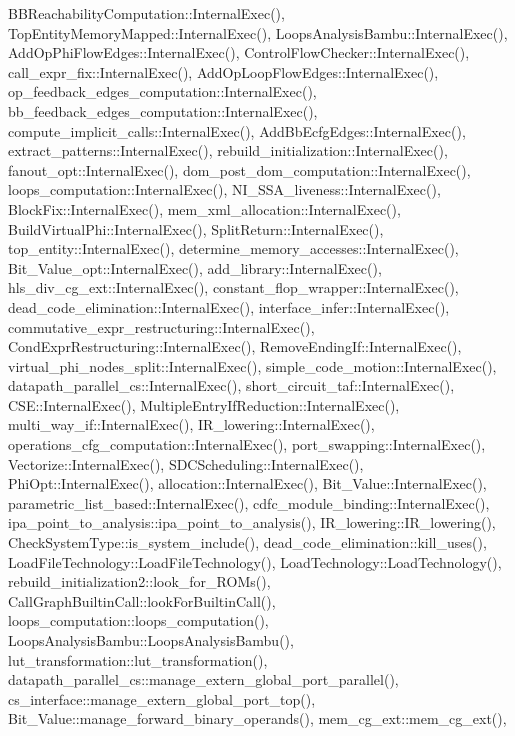B\+B\+Reachability\+Computation\+::\+Internal\+Exec(), Top\+Entity\+Memory\+Mapped\+::\+Internal\+Exec(), Loops\+Analysis\+Bambu\+::\+Internal\+Exec(), Add\+Op\+Phi\+Flow\+Edges\+::\+Internal\+Exec(), Control\+Flow\+Checker\+::\+Internal\+Exec(), call\+\_\+expr\+\_\+fix\+::\+Internal\+Exec(), Add\+Op\+Loop\+Flow\+Edges\+::\+Internal\+Exec(), op\+\_\+feedback\+\_\+edges\+\_\+computation\+::\+Internal\+Exec(), bb\+\_\+feedback\+\_\+edges\+\_\+computation\+::\+Internal\+Exec(), compute\+\_\+implicit\+\_\+calls\+::\+Internal\+Exec(), Add\+Bb\+Ecfg\+Edges\+::\+Internal\+Exec(), extract\+\_\+patterns\+::\+Internal\+Exec(), rebuild\+\_\+initialization\+::\+Internal\+Exec(), fanout\+\_\+opt\+::\+Internal\+Exec(), dom\+\_\+post\+\_\+dom\+\_\+computation\+::\+Internal\+Exec(), loops\+\_\+computation\+::\+Internal\+Exec(), N\+I\+\_\+\+S\+S\+A\+\_\+liveness\+::\+Internal\+Exec(), Block\+Fix\+::\+Internal\+Exec(), mem\+\_\+xml\+\_\+allocation\+::\+Internal\+Exec(), Build\+Virtual\+Phi\+::\+Internal\+Exec(), Split\+Return\+::\+Internal\+Exec(), top\+\_\+entity\+::\+Internal\+Exec(), determine\+\_\+memory\+\_\+accesses\+::\+Internal\+Exec(), Bit\+\_\+\+Value\+\_\+opt\+::\+Internal\+Exec(), add\+\_\+library\+::\+Internal\+Exec(), hls\+\_\+div\+\_\+cg\+\_\+ext\+::\+Internal\+Exec(), constant\+\_\+flop\+\_\+wrapper\+::\+Internal\+Exec(), dead\+\_\+code\+\_\+elimination\+::\+Internal\+Exec(), interface\+\_\+infer\+::\+Internal\+Exec(), commutative\+\_\+expr\+\_\+restructuring\+::\+Internal\+Exec(), Cond\+Expr\+Restructuring\+::\+Internal\+Exec(), Remove\+Ending\+If\+::\+Internal\+Exec(), virtual\+\_\+phi\+\_\+nodes\+\_\+split\+::\+Internal\+Exec(), simple\+\_\+code\+\_\+motion\+::\+Internal\+Exec(), datapath\+\_\+parallel\+\_\+cs\+::\+Internal\+Exec(), short\+\_\+circuit\+\_\+taf\+::\+Internal\+Exec(), C\+S\+E\+::\+Internal\+Exec(), Multiple\+Entry\+If\+Reduction\+::\+Internal\+Exec(), multi\+\_\+way\+\_\+if\+::\+Internal\+Exec(), I\+R\+\_\+lowering\+::\+Internal\+Exec(), operations\+\_\+cfg\+\_\+computation\+::\+Internal\+Exec(), port\+\_\+swapping\+::\+Internal\+Exec(), Vectorize\+::\+Internal\+Exec(), S\+D\+C\+Scheduling\+::\+Internal\+Exec(), Phi\+Opt\+::\+Internal\+Exec(), allocation\+::\+Internal\+Exec(), Bit\+\_\+\+Value\+::\+Internal\+Exec(), parametric\+\_\+list\+\_\+based\+::\+Internal\+Exec(), cdfc\+\_\+module\+\_\+binding\+::\+Internal\+Exec(), ipa\+\_\+point\+\_\+to\+\_\+analysis\+::ipa\+\_\+point\+\_\+to\+\_\+analysis(), I\+R\+\_\+lowering\+::\+I\+R\+\_\+lowering(), Check\+System\+Type\+::is\+\_\+system\+\_\+include(), dead\+\_\+code\+\_\+elimination\+::kill\+\_\+uses(), Load\+File\+Technology\+::\+Load\+File\+Technology(), Load\+Technology\+::\+Load\+Technology(), rebuild\+\_\+initialization2\+::look\+\_\+for\+\_\+\+R\+O\+Ms(), Call\+Graph\+Builtin\+Call\+::look\+For\+Builtin\+Call(), loops\+\_\+computation\+::loops\+\_\+computation(), Loops\+Analysis\+Bambu\+::\+Loops\+Analysis\+Bambu(), lut\+\_\+transformation\+::lut\+\_\+transformation(), datapath\+\_\+parallel\+\_\+cs\+::manage\+\_\+extern\+\_\+global\+\_\+port\+\_\+parallel(), cs\+\_\+interface\+::manage\+\_\+extern\+\_\+global\+\_\+port\+\_\+top(), Bit\+\_\+\+Value\+::manage\+\_\+forward\+\_\+binary\+\_\+operands(), mem\+\_\+cg\+\_\+ext\+::mem\+\_\+cg\+\_\+ext(), 
